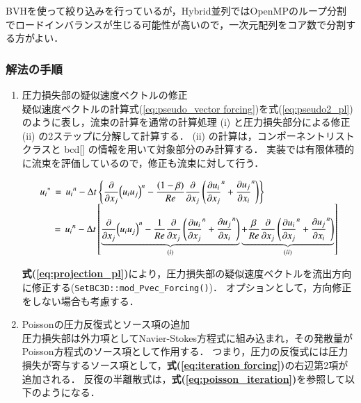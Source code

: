 BVHを使って絞り込みを行っているが，Hybrid並列ではOpenMPのループ分割でロードインバランスが生じる可能性が高いので，一次元配列をコア数で分割する方がよい．


\subsubsection{解法の手順}

\begin{enumerate}
\item 圧力損失部の疑似速度ベクトルの修正\\
疑似速度ベクトルの計算式(\ref{eq:pseudo_vector forcing})を式(\ref{eq:pseudo2_pl})のように表し，流束の計算を通常の計算処理 (i) と圧力損失部分による修正 (ii) の2ステップに分解して計算する．
(ii) の計算は，コンポーネントリストクラスと bcd[] の情報を用いて対象部分のみ計算する．
実装では有限体積的に流束を評価しているので，修正も流束に対して行う．

\begin{equation}
\begin{array}{l}
\displaystyle { 
{u_{i}}^{*} 
\,=\, 
{u_{i}}^{n} - \Delta{t} \left\{{ \frac{\partial}{\partial{x}_{j}} {\left({ u_{i} u_{j} }\right) }^{n} - \frac{(1-\beta)}{Re}\frac{\partial}{\partial x_{j}} \left({ {\frac{\partial u_{i}}{\partial x_{j}}}^{n} + {\frac{\partial u_{j}}{\partial x_{i}}}^{n} }\right) }\right\} }\\
\displaystyle {\hspace{1.5em} = \, {u_{i}}^{n} - \Delta{t} \left[{ 
\underbrace{
\frac{\partial}{\partial{x}_{j}} {\left({ u_{i} u_{j} }\right) }^{n} 
- \frac{1}{Re} \frac{\partial}{\partial x_{j}} \left({ {\frac{\partial u_{i}}{\partial x_{j}}}^{n} + {\frac{\partial u_{j}}{\partial x_{i}}}^{n} }\right)
}\limits_{(i)}
\underbrace{ 
+ \frac{\beta}{Re} \frac{\partial}{\partial x_{j}} \left({ {\frac{\partial u_{i}}{\partial x_{j}}}^{n} + {\frac{\partial u_{j}}{\partial x_{i}}}^{n} }\right) }\limits_{(ii)} }\right] 
}
\end{array}
\label{eq:pseudo2_pl}
\end{equation}

\textbf{式(\ref{eq:projection_pl})}により，圧力損失部の疑似速度ベクトルを流出方向に修正する(\verb|SetBC3D::mod_Pvec_Forcing()|)．
オプションとして，方向修正をしない場合も考慮する．

\vspace{2mm}

\item Poissonの圧力反復式とソース項の追加\\
圧力損失部は外力項としてNavier-Stokes方程式に組み込まれ，その発散量がPoisson方程式のソース項として作用する．
つまり，圧力の反復式には圧力損失が寄与するソース項として，\textbf{式(\ref{eq:iteration forcing})}の右辺第2項が追加される．
反復の半離散式は，\textbf{式(\ref{eq:poisson_iteration})}を参照して以下のようになる．


\end{enumerate}
